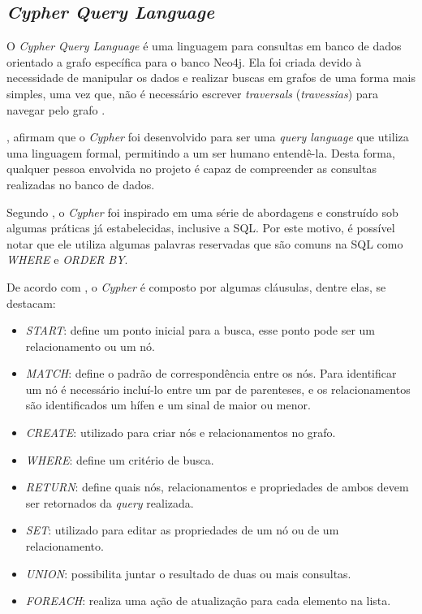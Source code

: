 \subsection{\textit{Cypher Query Language}}

\par O \textit{Cypher Query Language} é uma linguagem para consultas em banco de dados orientado a grafo específica para o banco Neo4j. Ela foi criada devido à necessidade de manipular os dados e realizar buscas em grafos de uma forma mais simples, uma vez que, não é necessário escrever \textit{traversals} (\textit{travessias}) para navegar pelo grafo \cite{neo4j_team_manual}.


\par {}, afirmam que o \textit{Cypher} foi desenvolvido para ser uma \textit{query language} que utiliza uma linguagem formal, permitindo a um ser humano entendê-la. Desta forma, qualquer pessoa envolvida no projeto é capaz de compreender as consultas realizadas no banco de dados. 

\par Segundo , o \textit{Cypher} foi inspirado em uma série de abordagens e construído sob algumas práticas já estabelecidas, inclusive a SQL. Por este motivo, é possível notar que ele utiliza algumas palavras reservadas que são comuns na SQL como \textit{WHERE} e \textit{ORDER BY}.

\par De acordo com , o \textit{Cypher} é composto por algumas cláusulas, dentre elas, se destacam:

\begin{itemize}
	\item \textit{START}: define um ponto inicial para a busca, esse ponto pode ser um relacionamento ou um nó.
	\item \textit{MATCH}: define o padrão de correspondência entre os nós. Para identificar um nó é necessário incluí-lo entre um par de parenteses, e os relacionamentos são identificados um hífen e um sinal de maior ou menor.
	\item \textit{CREATE}: utilizado para criar nós e relacionamentos no grafo.
	\item \textit{WHERE}: define um critério de busca.
	\item \textit{RETURN}: define quais nós, relacionamentos e propriedades de ambos devem ser retornados da \textit{query} realizada. 
	\item \textit{SET}: utilizado para editar as propriedades de um nó ou de um relacionamento.
	\item \textit{UNION}: possibilita juntar o resultado de duas ou mais consultas.
	\item \textit{FOREACH}: realiza uma ação de atualização para cada elemento na lista.
\end{itemize} 

